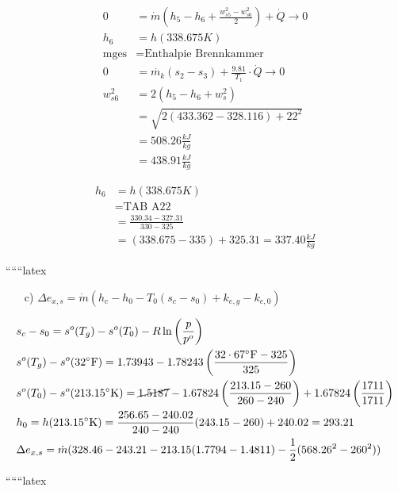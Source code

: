 \begin{align*}
0 &= \dot{m} (h_5 - h_6 + \frac{w_{s5}^2 - w_{s6}^2}{2}) + \dot{Q} \rightarrow 0 \\
h_6 &= h(338.675K) \\
\text{mges} &= \text{Enthalpie Brennkammer} \\
0 &= \dot{m_k} (s_2 - s_3) + \frac{9.81}{T_1} \cdot \dot{Q} \rightarrow 0 \\
w_{s6}^2 &= 2 (h_5 - h_6 + w_s^2) \\
&= \sqrt{2 (433.362 - 328.116) + 22^2} \\
&= 508.26 \frac{kJ}{kg} \\
&= 438.91 \frac{kJ}{kg}
\end{align*}

\begin{align*}
h_6 &= h(338.675K) \\
&= \text{TAB A22} \\
&= \frac{330.34 - 327.31}{330 - 325} \\
&= (338.675 - 335) + 325.31 = 337.40 \frac{kJ}{kg}
\end{align*}

``````latex


\begin{itemize}
    \item[c)] $\Delta e_{x,s} = \dot{m} (h_c - h_0 - T_0 (s_c - s_0) + k_{e,g} - k_{e,0})$
\end{itemize}

\[
\begin{aligned}
    &s_c - s_0 = s^o(T_g) - s^o(T_0) - R \ln \left( \frac{p}{p^o} \right) \\
    &s^o(T_g) - s^o(32^\circ \text{F}) = 1.73943 - 1.78243 \left( \frac{32 \cdot 67^\circ \text{F} - 325}{325} \right) \\
    &s^o(T_0) - s^o(213.15^\circ \text{K}) = \cancel{1.5187} - 1.67824 \left( \frac{213.15 - 260}{260 - 240} \right) + 1.67824 \left( \frac{1711}{1711} \right) \\
    &h_0 = h(213.15^\circ \text{K}) = \frac{256.65 - 240.02}{240 - 240} (243.15 - 260) + 240.02 = 293.21 \\
    &\Delta e_{x,s} = \dot{m} (328.46 - 243.21 - 213.15 (1.7794 - 1.4811) - \frac{1}{2} (568.26^2 - 260^2))
\end{aligned}
\]

``````latex


